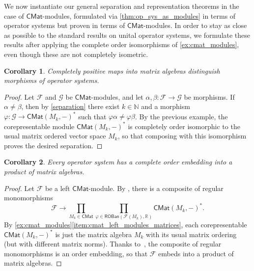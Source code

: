 \documentclass[11pt,onecolumn]{article}
\newcommand{\R}{\mathbb{R}}
\newcommand{\N}{\mathbb{N}}
\newcommand{\ROBan}{\mathsf{ROBan}}
\theoremstyle{plain}
\newtheorem{corollary}[corollary]{Corollary}
\theoremstyle{remark}
\theoremstyle{definition}
\begin{document}
We now instantiate our general separation and representation theorems in the case of $\mathsf{CMat}$-modules,
formulated via \cref{thm:op_sys_as_modules} in terms of operator systems but proven in terms of $\mathsf{CMat}$-modules.
In order to stay as close as possible to the standard results on unital operator systems,
we formulate these results after applying the complete order isomorphisms of \cref{ex:cmat_modules},
even though these are not completely isometric.

\begin{corollary}
	\label{cor:op_sys_separation}
	Completely positive maps into matrix algebras distinguish morphisms of operator systems.
\end{corollary}
\begin{proof}
	Let $\mathcal{F}$ and $\mathcal{G}$ be $\mathsf{CMat}$-modules, and let $\alpha, \beta \colon \mathcal{F} \to \mathcal{G}$
	be morphisms.
	If $\alpha \neq \beta$, then by \cref{separation} there exist $k \in \N$ and a morphism $\varphi \colon \mathcal{G} \to \mathsf{CMat}(M_k, -)^*$
	such that $\varphi \alpha \neq \varphi \beta$.
	By the previous example, the corepresentable module $\mathsf{CMat}(M_k, -)^*$ is completely order isomorphic to the usual matrix ordered vector space $M_k$,
	so that composing with this isomorphism proves the desired separation.
\end{proof}

\begin{corollary}
	\label{cor:op_sys_representation}
	Every operator system has a complete order embedding into a product of matrix algebras.
\end{corollary}
\begin{proof}
	Let $\mathcal{F}$ be a left $\mathsf{CMat}$-module.
	By , there is a composite of regular monomorphisms
	\[
		\mathcal{F}
		\longrightarrow
		\prod_{M_k \in \mathsf{CMat}}
		\prod_{\varphi \in \ROBan(\mathcal{F}(M_k),\R)}
		\mathsf{CMat}(M_k,-)^*.
	\]
	By \cref{ex:cmat_modules}\ref{item:cmat_left_modules_matrices}, each corepresentable $\mathsf{CMat}(M_k,-)^*$ is just the matrix algebra $M_k$ with its usual matrix ordering (but with different matrix norms).
	Thanks to~, the composite of regular monomorphisms is an order embedding, so that $\mathcal{F}$ embeds into a product of matrix algebras.
\end{proof}
\end{document}
